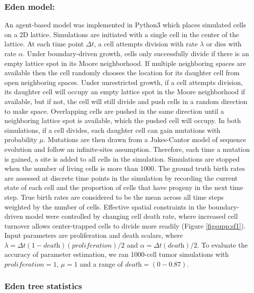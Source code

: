\documentclass[12pt]{elife_based}
\begin{document}
\subsubsection*{Eden model:} An agent-based model was implemented in Python3 which places simulated cells on a 2D lattice. Simulations are initiated with a single cell in the center of the lattice. At each time point $\Delta t$, a cell attempts division with rate $\lambda$ or dies with rate $\alpha$. Under boundary-driven growth, cells only successfully divide if there is an empty lattice spot in its Moore neighborhood. If multiple neighboring spaces are available then the cell randomly chooses the location for its daughter cell from open neighboring spaces. Under unrestricted growth, if a cell attempts division, its daughter cell will occupy an empty lattice spot in the Moore neighborhood if available, but if not, the cell will still divide and push cells in a random direction to make space. Overlapping cells are pushed in the same direction until a neighboring lattice spot is available, which the pushed cell will occupy. In both simulations, if a cell divides, each daughter cell can gain mutations with probability $\mu$. Mutations are then drawn from a Jukes-Cantor model of sequence evolution and follow an infinite-sites assumption. Therefore, each time a mutation is gained, a site is added to all cells in the simulation. Simulations are stopped when the number of living cells is more than 1000. The ground truth birth rates are assessed at discrete time points in the simulation by recording the current state of each cell and the proportion of cells that have progeny in the next time step. True birth rates are considered to be the mean across all time steps weighted by the number of cells. Effective spatial constraints in the boundary-driven model were controlled by changing cell death rate, where increased cell turnover allows center-trapped cells to divide more readily (Figure \ref{figsupp:sf1}). Input parameters are proliferation and death scalars, where $\lambda = \Delta t(1 - \textit{death})(\textit{proliferation})/2$ and $\alpha = \Delta t(\textit{death})/2$. To evaluate the accuracy of parameter estimation, we ran 1000-cell tumor simulations with $\textit{proliferation} = 1$, $\mu = 1$ and a range of $\textit{death} = (0-0.87)$. 

\subsubsection*{Eden tree statistics}
\end{document}

